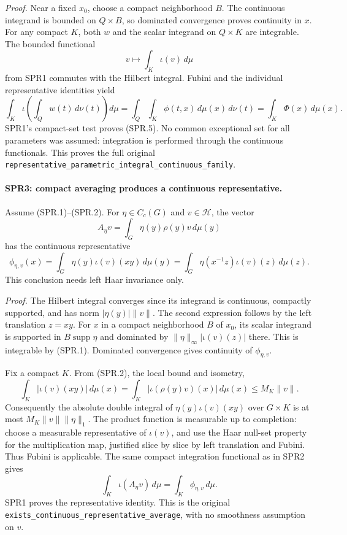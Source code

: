 \documentclass[11pt,a4paper]{article}
\numberwithin{equation}{section}
\theoremstyle{remark}\newtheorem{remark}[theorem]{Remark}
\begin{document}
\emph{Proof.}
Near a fixed \(x_0\), choose a compact neighborhood \(B\).
The continuous integrand is bounded on \(Q\times B\), so dominated
convergence proves continuity in \(x\).
For any compact \(K\), both \(w\) and the scalar integrand on
\(Q\times K\) are integrable.  The bounded functional
\[
 v\longmapsto\int_K\iota(v)\,d\mu
\]
from SPR1 commutes with the Hilbert integral.  Fubini and the
individual representative identities yield
\[
 \int_K\iota\!\left(\int_Q w(t)\,d\nu(t)\right)d\mu
 =\int_Q\int_K\phi(t,x)\,d\mu(x)\,d\nu(t)
 =\int_K\Phi(x)\,d\mu(x).
\]
SPR1's compact-set test proves (SPR.5).
No common exceptional set for all parameters was assumed:
integration is performed through the continuous functionals.
This proves the full original
\texttt{representative\_\allowbreak parametric\_\allowbreak integral\_\allowbreak continuous\_\allowbreak family}.

\paragraph{SPR3: compact averaging produces a continuous representative.}
\label{claim:SPR3}
Assume (SPR.1)--(SPR.2).  For \(\eta\in C_c(G)\) and \(v\in\mathcal H\),
the vector
\[
 A_\eta v=\int_G\eta(y)\rho(y)v\,d\mu(y)
\]
has the continuous representative
\[
 \phi_{\eta,v}(x)
   =\int_G\eta(y)\iota(v)(xy)\,d\mu(y)
   =\int_G\eta(x^{-1}z)\iota(v)(z)\,d\mu(z).
 \tag{SPR.6}
\]
This conclusion needs left Haar invariance only.

\emph{Proof.}
The Hilbert integral converges since its integrand is continuous,
compactly supported, and has norm \(|\eta(y)|\|v\|\).
The second expression follows by the left translation \(z=xy\).
For \(x\) in a compact neighborhood \(B\) of \(x_0\), its scalar
integrand is supported in \(B\operatorname{supp}\eta\) and dominated
by
\(\|\eta\|_\infty|\iota(v)(z)|\) there.
This is integrable by (SPR.1).  Dominated convergence gives
continuity of \(\phi_{\eta,v}\).

Fix a compact \(K\).  From (SPR.2), the local bound and isometry,
\[
 \int_K|\iota(v)(xy)|\,d\mu(x)
 =\int_K|\iota(\rho(y)v)(x)|\,d\mu(x)
 \le M_K\|v\|.
\]
Consequently the absolute double integral of
\(\eta(y)\iota(v)(xy)\) over \(G\times K\) is at most
\(M_K\|v\|\|\eta\|_1\).
The product function is measurable up to completion: choose a
measurable representative of \(\iota(v)\), and use the Haar
null-set property for the multiplication map, justified slice by
slice by left translation and Fubini.
Thus Fubini is applicable.  The same compact integration
functional as in SPR2 gives
\[
 \int_K\iota(A_\eta v)\,d\mu=\int_K\phi_{\eta,v}\,d\mu.
\]
SPR1 proves the representative identity.
This is the original
\texttt{exists\_\allowbreak continuous\_\allowbreak representative\_\allowbreak average}, with no
smoothness assumption on \(v\).
\end{document}
